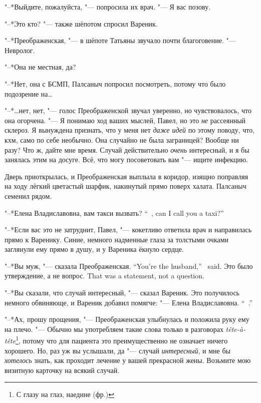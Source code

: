 "--*Выйдите, пожалуйста, "--- попросила их врач.
"--- Я вас позову.

"--*Это кто? "--- также шёпотом спросил Вареник.

"--*Преображенская, "--- в шёпоте Татьяны звучало почти благоговение.
"--- Невролог.

"--*Она не местная, да?

"--*Нет, она с БСМП, Палсаныч попросил посмотреть, потому что было подозрение на\dots{}

"--*\dots{}нет, нет, "--- голос Преображенской звучал уверенно, но чувствовалось, что она огорчена.
"--- Я понимаю ход ваших мыслей, Павел, но это \emph{не} рассеянный склероз.
Я вынуждена признать, что у меня нет \emph{даже идей} по этому поводу, что, кхм, само по себе необычно.
Она случайно не была заграницей?
Вообще ни разу?
Что ж, дайте мне время.
Случай действительно \emph{очень} интересный, и я бы занялась этим на досуге.
Всё, что могу посоветовать вам "--- ищите инфекцию.

Дверь приоткрылась, и Преображенская выплыла в коридор, изящно поправляя на ходу лёгкий цветастый шарфик, накинутый прямо поверх халата.
Палсаныч семенил рядом.

{"--*Елена Владиславовна, вам такси вызвать?}
{``\Yelena\ \Vladislavovna, can I call you a taxi?''}

"--*Если вас это не затруднит, Павел, "--- кокетливо ответила врач и направилась прямо к Варенику.
Синие, немного надменные глаза за толстыми очками заглянули ему прямо в душу, и у Вареника ёкнуло сердце.

{"--*Вы муж, "--- сказала Преображенская.}
{``You're the husband,'' \Preobrazhenskaya\ said.}
{Это было утверждение, а не вопрос.}
{That was a statement, not a question.}

"--*Вы сказали, что случай интересный, "--- сказал Вареник.
Это получилось немного обвиняюще, и Вареник добавил помягче:
{"--- Елена Владиславовна.}
{``\Yelena\ \Vladislavovna.''}

"--*Ах, прошу прощения, "--- Преображенская улыбнулась и положила руку ему на плечо.
"--- Обычно мы употребляем такие слова только в разговорах \textit{tête-à-tête}\footnote{С глазу на глаз, наедине (фр.)}, потому что для пациента это преимущественно не означает ничего хорошего.
Но, раз уж вы услышали, да "--- случай \emph{интересный}, и мне бы \emph{хотелось} знать, как проходит лечение у вашей прекрасной жены.
Возьмите мою визитную карточку на всякий случай.

